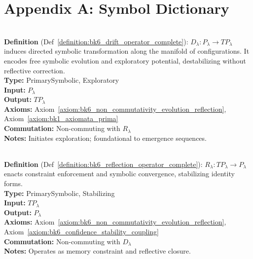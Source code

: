 \clearpage
\chapter*{Appendix A: Symbol Dictionary}

\begin{description}[leftmargin=2.5cm, style=nextline]

\item[\textbf{Symbolic Drift Operator} \hfill \( D_{\lambda} \)] \leavevmode\\
\textbf{Definition} (Def~\ref{definition:bk6_drift_operator_complete}): \( D_{\lambda} : P_\lambda \rightarrow T P_\lambda \) induces directed symbolic transformation along the manifold of configurations. It encodes free symbolic evolution and exploratory potential, destabilizing without reflective correction.\\
\textbf{Type:} PrimarySymbolic, Exploratory\\
\textbf{Input:} \( P_\lambda \)\\
\textbf{Output:} \( T P_\lambda \)\\
\textbf{Axioms:} Axiom~\ref{axiom:bk6_non_commutativity_evolution_reflection}, Axiom~\ref{axiom:bk1_axiomata_prima}\\
\textbf{Commutation:} Non-commuting with \( R_{\lambda} \)\\
\textbf{Notes:} Initiates exploration; foundational to emergence sequences.

\item[\textbf{Symbolic Reflection Operator} \hfill \( R_{\lambda} \)] \leavevmode\\
\textbf{Definition} (Def~\ref{definition:bk6_reflection_operator_complete}): \( R_{\lambda} : T P_\lambda \rightarrow P_\lambda \) enacts constraint enforcement and symbolic convergence, stabilizing identity forms.\\
\textbf{Type:} PrimarySymbolic, Stabilizing\\
\textbf{Input:} \( T P_\lambda \)\\
\textbf{Output:} \( P_\lambda \)\\
\textbf{Axioms:} Axiom~\ref{axiom:bk6_non_commutativity_evolution_reflection}, Axiom~\ref{axiom:bk6_confidence_stability_coupling}\\
\textbf{Commutation:} Non-commuting with \( D_{\lambda} \)\\
\textbf{Notes:} Operates as memory constraint and reflective closure.


\end{description}
